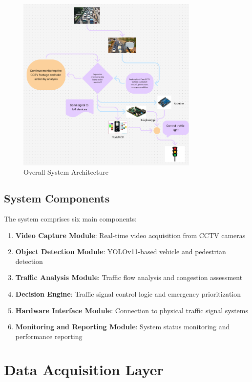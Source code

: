 \begin{figure}[h]
    \centering
    \includegraphics[width=0.8\textwidth]{figures/6_.png}
    \caption{Overall System Architecture}
    \label{fig:system_architecture}
\end{figure}

\subsection{System Components}

The system comprises six main components:

\begin{enumerate}
    \item \textbf{Video Capture Module}: Real-time video acquisition from CCTV cameras
    \item \textbf{Object Detection Module}: YOLOv11-based vehicle and pedestrian detection
    \item \textbf{Traffic Analysis Module}: Traffic flow analysis and congestion assessment
    \item \textbf{Decision Engine}: Traffic signal control logic and emergency prioritization
    \item \textbf{Hardware Interface Module}: Connection to physical traffic signal systems
    \item \textbf{Monitoring and Reporting Module}: System status monitoring and performance reporting
\end{enumerate}

\section{Data Acquisition Layer}

